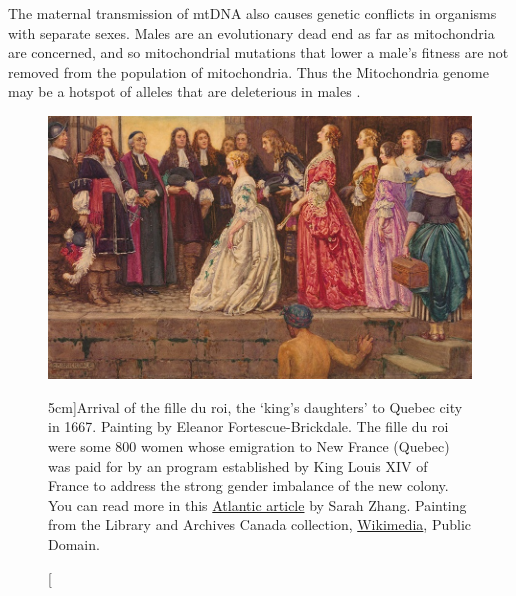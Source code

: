 {The maternal transmission of mtDNA also causes genetic conflicts in organisms
with separate sexes. Males are an evolutionary dead end as far as
mitochondria are concerned, and so mitochondrial mutations that lower a male's
fitness are not removed from the population of mitochondria. Thus the
Mitochondria genome may be a hotspot of alleles that are deleterious in males
\citep[an effect termed the ``Mother's curse''][]{}.
 \begin{figure}
\begin{center}
  \includegraphics[width= \textwidth]{illustration_images/single_locus_selection/fille_du_roi/fille_du_roi.png}
\end{center}
\caption[][5cm]{Arrival of the fille du roi, the `king's daughters' to
  Quebec city in 1667. Painting
  by Eleanor Fortescue-Brickdale.  The fille du roi were some 800 women whose emigration to New France (Quebec) was paid for by an program established by
  King Louis XIV of France to address the strong gender imbalance of
  the new colony. You can read more in this \href{https://www.theatlantic.com/science/archive/2017/09/how-a-fille-du-roy-brought-the-mothers-curse-to-canada/540153/}{Atlantic article} by Sarah Zhang.
\newline \noindent \tiny{
 Painting from the Library and Archives Canada collection,
 \href{https://commons.wikimedia.org/wiki/File:Arrival_of_the_Brides_-_Eleanor_Fortescue-Brickdale.png}{Wikimedia},
 Public Domain.}} \label{fig:fille_du_roi}  %
\end{figure}
}
